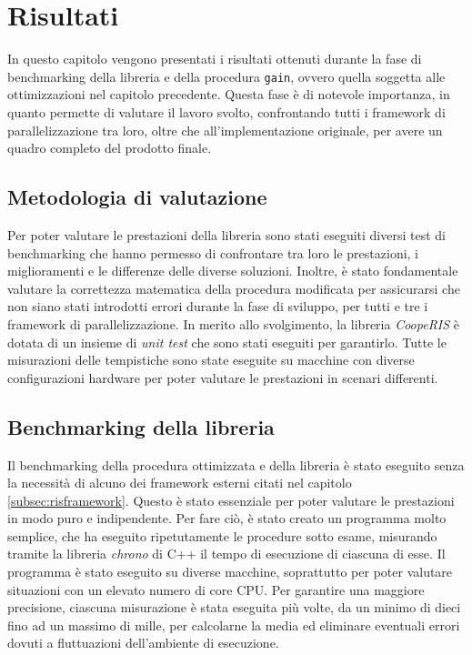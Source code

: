 \chapter{Risultati}
\label{ch:risultati}

In questo capitolo vengono presentati i risultati ottenuti durante la fase di
benchmarking della libreria e della procedura \texttt{gain}, ovvero quella
soggetta alle ottimizzazioni nel capitolo precedente. Questa fase è di notevole importanza,
in quanto permette di valutare il lavoro svolto, confrontando tutti i framework di
parallelizzazione tra loro, oltre che all'implementazione originale, per avere un
quadro completo del prodotto finale.

\section{Metodologia di valutazione}
\label{sec:bencharmking}

Per poter valutare le prestazioni della libreria sono stati eseguiti diversi
test di benchmarking che hanno permesso di confrontare tra loro le prestazioni, i
miglioramenti e le differenze delle diverse soluzioni. Inoltre, è stato fondamentale
valutare la correttezza matematica della procedura modificata per assicurarsi che
non siano stati introdotti errori durante la fase di sviluppo, per tutti e tre i
framework di parallelizzazione. In merito allo svolgimento, la libreria \textit{CoopeRIS}
è dotata di un insieme di \textit{unit test} che sono stati eseguiti per
garantirlo. Tutte le misurazioni delle tempistiche sono state eseguite su macchine
con diverse configurazioni hardware per poter valutare le prestazioni in scenari
differenti.

\section{Benchmarking della libreria}
\label{sec:benchmarking}

Il benchmarking della procedura ottimizzata e della libreria è stato eseguito
senza la necessità di alcuno dei framework esterni citati nel capitolo
\ref{subsec:risframework}. Questo è stato essenziale per poter valutare le prestazioni
in modo puro e indipendente. Per fare ciò, è stato creato un programma molto semplice,
che ha eseguito ripetutamente le procedure sotto esame, misurando tramite la libreria
\textit{chrono} di C++ il tempo di esecuzione di ciascuna di esse. Il programma è
stato eseguito su diverse macchine, soprattutto per poter valutare situazioni
con un elevato numero di core CPU. Per garantire una maggiore precisione,
ciascuna misurazione è stata eseguita più volte, da un minimo di dieci fino ad un
massimo di mille, per calcolarne la media ed eliminare eventuali errori dovuti a
fluttuazioni dell'ambiente di esecuzione.

